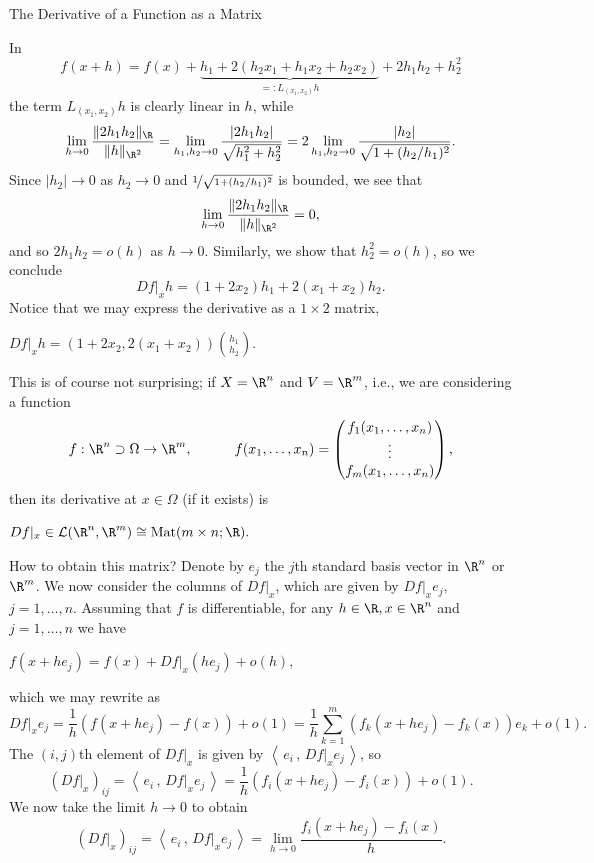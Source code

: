 \documentclass[smaller,hyperref={CJKbookmarks=true}]{beamer}
\newcommand{\scp}[2]{\left\langle\,#1\,,\,#2\,\right\rangle} \newcommand{\scpp}{\langle\,\cdot\,,\,\cdot\,\rangle}
\begin{document}
\begin{frame}{The Derivative of a Function as a Matrix}
\begin{spacing}{1}
In
\[f(x+h)=f(x)+\underbrace{h_1+2(h_2x_1+h_1x_2+h_2x_2)}_{=:L_{(x_1,x_2)}h}+2h_1h_2+h_2^2\]
the term $L_{(x_1,x_2)}h$ is clearly linear in $h$, while
\[\lim_{h\to0}\frac{\|2h_1h_2\|_{\R}}{\|h\|_{\R^2}}=\lim_{h_1,h_2\to0}\frac{|2h_1h_2|}{\sqrt{h_1^2+h_2^2}}=2\lim_{h_1,h_2\to0}\frac{|h_2|}{\sqrt{1+(h_2/h_1)^2}}.\]
Since $|h_2|\to0$ as $h_2\to0$ and $\nicefrac{1}{\sqrt{1+(h_2/h_1)^2}}$ is bounded, we see that
\[\lim_{h\to0}\frac{\|2h_1h_2\|_{\R}}{\|h\|_{\R^2}}=0,\]
and so $2h_1h_2=o(h)$ as $h\to0$. Similarly, we show that $h_2^2=o(h)$, so we conclude
\[Df|_xh=(1+2x_2)h_1+2(x_1+x_2)h_2.\]
\newpage
Notice that we may express the derivative as a $1\times 2$ matrix,
\begin{center}
$\displaystyle Df|_xh=\left(1+2x_2,2(x_1+x_2)\right)\binom{h_1}{h_2}.$
\end{center}
This is of course not surprising; if $X=\R^n$ and $V=\R^m$, i.e., we are considering a function
\[f:\R^n\supset\Omega\to\R^m,\qquad\quad f(x_1,\ldots,x_n)=\begin{pmatrix}
                    f_1(x_1,\ldots,x_n) \\
                    \vdots \\
                    f_m(x_1,\ldots,x_n)
                  \end{pmatrix},\]
then its derivative at $x\in\Omega$ (if it exists) is
\begin{center}
$Df|_x\in\mathcal{L}(\R^n,\R^m)\cong\text{Mat}(m\times n;\R).$
\end{center}
How to obtain this matrix? Denote by $e_j$ the $j$th standard basis vector in $\R^n$ or $\R^m$. We now consider the columns of $Df|_x$, which are given by $Df|_xe_j,$\\ $j=1,\ldots,n.$
\newpage
Assuming that $f$ is dif{}ferentiable, for any $h\in\R,x\in\R^n$ and $j=1,\ldots,n$ we have
\begin{center}
  $\displaystyle f(x+he_j)=f(x)+Df|_x(he_j)+o(h),$
\end{center}
which we may rewrite as
\[Df|_xe_j=\frac{1}{h}(f(x+he_j)-f(x))+o(1)
=\frac{1}{h}\sum_{k=1}^{m}(f_k(x+he_j)-f_k(x))e_k
+o(1).\]
The $(i,j)$th element of $Df|_x$ is given by $\scp{e_i}{Df|_xe_j}$, so
\[(Df|_x)_{ij}=\scp{e_i}{Df|_xe_j}=\frac{1}{h}
(f_i(x+he_j)-f_i(x))+o(1).\]
We now take the limit $h\to0$ to obtain
\[(Df|_x)_{ij}=\scp{e_i}{Df|_xe_j}=\lim_{h\to0}
\frac{f_i(x+he_j)-f_i(x)}{h}.\]
\end{spacing}
\end{frame}
\end{document}
